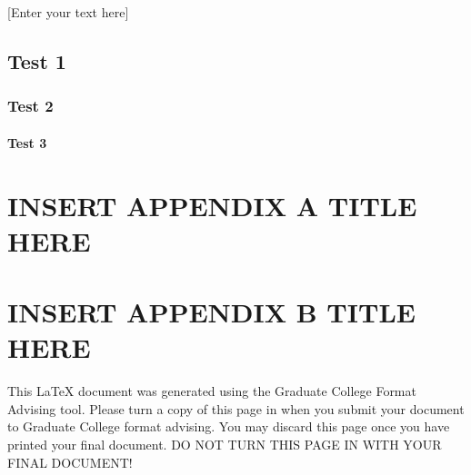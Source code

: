 \documentclass[oneside,11pt]{memoir}
\begin{document}
\DoubleSpacing
\setlength{\parindent}{.5in}
[Enter your text here]

\section{Test 1}
\subsection{Test 2}
\subsubsection{Test 3}

\clearpage


\vspace*{1in}
\begin{SingleSpace}
	

\end{SingleSpace}


\appendix
{}
\chapter{\uppercase{Insert Appendix A Title here}}
\clearpage
\chapter{\uppercase{Insert Appendix B Title here}}
\clearpage


This LaTeX document was generated using the Graduate College Format Advising tool. Please turn a copy of this page in when you submit your document to Graduate College format advising. You may discard this page once you have printed your final document. DO NOT TURN THIS PAGE IN WITH YOUR FINAL DOCUMENT!
\end{document}
